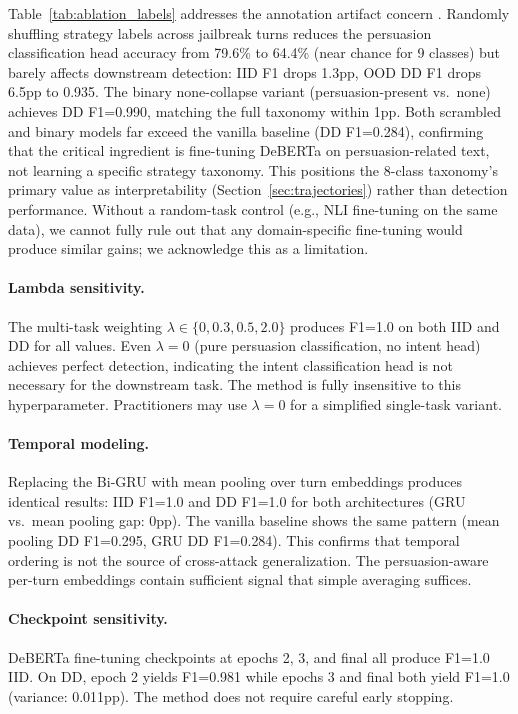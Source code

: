 \documentclass[11pt,a4paper]{article}
\begin{document}
Table~\ref{tab:ablation_labels} addresses the annotation artifact concern \cite{gururangan2018annotation}. Randomly shuffling strategy labels across jailbreak turns reduces the persuasion classification head accuracy from 79.6\% to 64.4\% (near chance for 9 classes) but barely affects downstream detection: IID F1 drops 1.3pp, OOD DD F1 drops 6.5pp to 0.935. The binary none-collapse variant (persuasion-present vs.\ none) achieves DD F1=0.990, matching the full taxonomy within 1pp. Both scrambled and binary models far exceed the vanilla baseline (DD F1=0.284), confirming that the critical ingredient is fine-tuning DeBERTa on persuasion-related text, not learning a specific strategy taxonomy. This positions the 8-class taxonomy's primary value as interpretability (Section~\ref{sec:trajectories}) rather than detection performance. Without a random-task control (e.g., NLI fine-tuning on the same data), we cannot fully rule out that any domain-specific fine-tuning would produce similar gains; we acknowledge this as a limitation.

\paragraph{Lambda sensitivity.}
The multi-task weighting $\lambda \in \{0, 0.3, 0.5, 2.0\}$ produces F1=1.0 on both IID and DD for all values. Even $\lambda=0$ (pure persuasion classification, no intent head) achieves perfect detection, indicating the intent classification head is not necessary for the downstream task. The method is fully insensitive to this hyperparameter. Practitioners may use $\lambda=0$ for a simplified single-task variant.

\paragraph{Temporal modeling.}
Replacing the Bi-GRU with mean pooling over turn embeddings produces identical results: IID F1=1.0 and DD F1=1.0 for both architectures (GRU vs.\ mean pooling gap: 0pp). The vanilla baseline shows the same pattern (mean pooling DD F1=0.295, GRU DD F1=0.284). This confirms that temporal ordering is not the source of cross-attack generalization. The persuasion-aware per-turn embeddings contain sufficient signal that simple averaging suffices.

\paragraph{Checkpoint sensitivity.}
DeBERTa fine-tuning checkpoints at epochs 2, 3, and final all produce F1=1.0 IID. On DD, epoch 2 yields F1=0.981 while epochs 3 and final both yield F1=1.0 (variance: 0.011pp). The method does not require careful early stopping.
\end{document}
